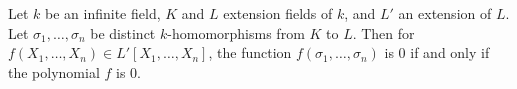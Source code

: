 Let $k$ be an infinite field, $K$ and $L$ extension fields of $k$, and $L'$ an extension of $L$. Let $\sigma_1, \ldots, \sigma_n$ be distinct $k$-homomorphisms from $K$ to $L$. Then for $f(X_1, \ldots, X_n) \in L'[X_1, \ldots, X_n]$, the function $f(\sigma_1, \ldots, \sigma_n)$ is $0$ if and only if the polynomial $f$ is $0$.
